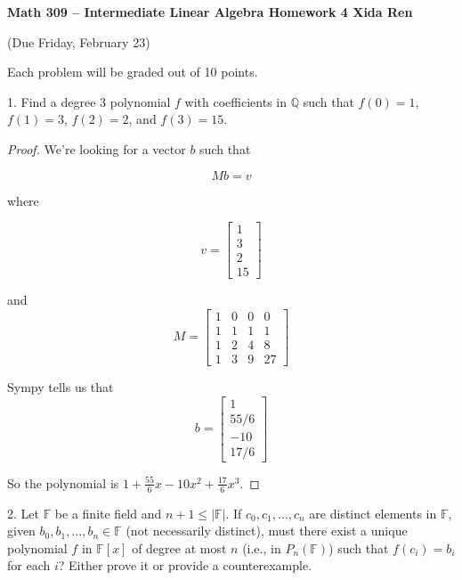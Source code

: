 \documentclass[12pt]{article} %
\newcommand{\Q}{\mathbb{Q}}
\newcommand{\F}{\mathbb{F}}
\renewcommand\le{\leqslant}
\begin{document}
 
\noindent
\textbf{Math 309 -- Intermediate Linear Algebra \quad 
Homework 4 \hfill Xida Ren}\\
\begin{center}
  (Due Friday, February 23)
\end{center}
\medskip

Each problem will be graded out of 10 points.

\vspace{1cm}

\begin{flushleft}

1.  Find a degree $3$ polynomial $f$ with coefficients in $\Q$ such that $f(0) = 1$, $f(1) = 3$, $f(2) = 2$, and $f(3) = 15$.\\

\begin{proof}
  We're looking for a vector $b$ such that 
  
  $$Mb = v
  $$

  where 

  $$v=\begin{bmatrix}
    1\\
    3\\
    2\\
    15
  \end{bmatrix}
  $$

  and 
  $$M =
  \begin{bmatrix}
    1 & 0 & 0 & 0\\
    1 & 1 & 1 & 1\\
    1 & 2 & 4 & 8\\
    1 & 3 & 9 & 27
  \end{bmatrix}
  $$

  Sympy tells us that 
  $$
  b =
  \begin{bmatrix}
    1\\
    55/6\\
    -10\\
    17/6
  \end{bmatrix}
  $$
  
  So the polynomial is 
  $1 + \frac{55}{6}x - 10 x^2 + \frac{17}{6}x^3$.
\end{proof}

\vspace{.5cm}

2.  Let $\F$ be a finite field and $n + 1 \le |\F|$. If $c_0, c_1, \dots, c_n$ are distinct elements in $\F$, given $b_0, b_1, \dots, b_n \in \F$ (not necessarily distinct), must there exist a unique polynomial $f$ in $\F[x]$ of degree at most $n$ (i.e., in $P_n(\F)$) such that $f(c_i) = b_i$ for each $i$?  Either prove it or provide a counterexample.


\end{flushleft}
\end{document}
